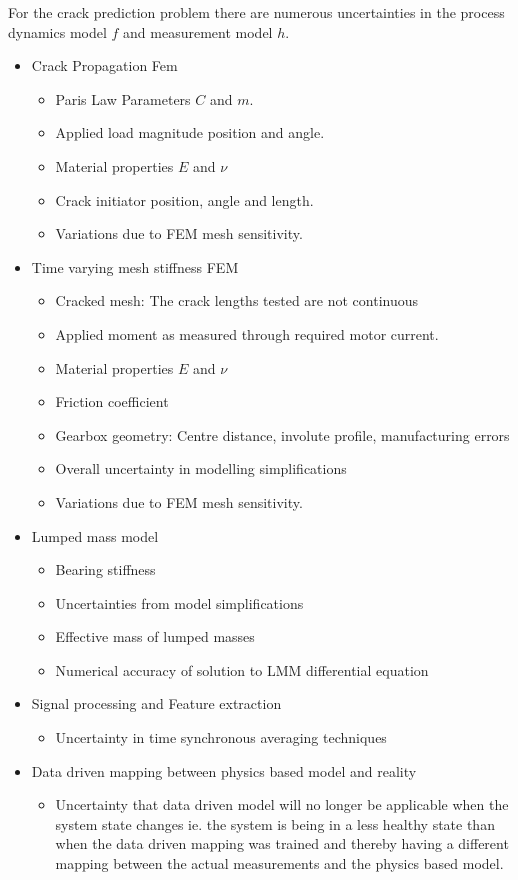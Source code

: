 For the crack prediction problem there are numerous uncertainties in the process dynamics model $f$ and measurement model $h$.

\begin{itemize}
	\item Crack Propagation Fem
	\begin{itemize}
		\item Paris Law Parameters $C$ and $m$.
		\item Applied load magnitude position and angle. 
		\item Material properties $E$ and $\nu$
		\item Crack initiator position, angle and length.
		\item Variations due to FEM mesh sensitivity. 
	\end{itemize}
	\item Time varying mesh stiffness FEM
	\begin{itemize}
		\item Cracked mesh: The crack lengths tested are not continuous
		\item Applied moment as measured through required motor current.
		\item Material properties $E$ and $\nu$
		\item Friction coefficient
		\item Gearbox geometry: Centre distance, involute profile, manufacturing errors
		\item Overall uncertainty in modelling simplifications
		\item Variations due to FEM mesh sensitivity. 
	\end{itemize}
	\item Lumped mass model 
	\begin{itemize}
		\item Bearing stiffness
		\item Uncertainties from model simplifications
		\item Effective mass of lumped masses
		\item Numerical accuracy of solution to LMM differential equation
	\end{itemize}
	\item Signal processing and Feature extraction
	\begin{itemize}
		\item Uncertainty in time synchronous averaging techniques
	\end{itemize}
	\item Data driven mapping between physics based model and reality
	\begin{itemize}
		\item Uncertainty that data driven model will no longer be applicable when the system state changes ie. the system is being in a less healthy state than when the data driven mapping was trained and thereby having a different mapping between the actual measurements and the physics based model.
	\end{itemize}
\end{itemize}


